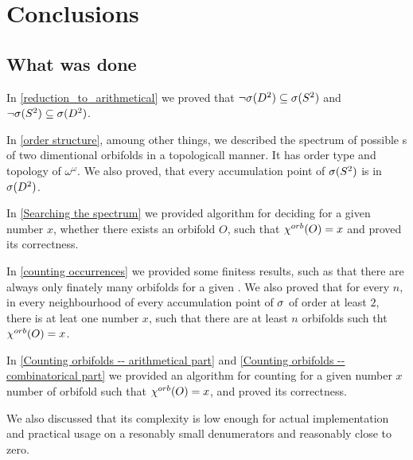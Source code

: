 \chapter{Conclusions}

\section{What was done}
In \ref{reduction_to_arithmetical} we proved that $\neg {{\sigma}(D^2)} \subseteq {{\sigma}(S^2)}$ and 
$\neg {{\sigma}(S^2)} \subseteq {{\sigma}(D^2)}$. 

In \ref{order structure}, amoung other things, we described the spectrum of possible \Eoc s 
of two dimentional orbifolds in a topologicall manner. 
It has order type and topology of $\omega^\omega$. 
We also proved, that every accumulation point of ${{\sigma}(S^2)}$ is in ${{\sigma}(D^2)}$.

In \ref{Searching the spectrum} 
we provided algorithm for deciding for a given number $x$, whether 
there exists an orbifold $O$, such that ${\chi^{orb}(O)} = x$ and proved its correctness.

In \ref{counting occurrences} we provided some finitess results, such as that 
there are always only finately many 
orbifolds for a given \Eoc. 
We also proved that for every $n$, in every neighbourhood of every accumulation point 
of ${\sigma}$ of order at least $2$, there is at leat one number $x$, such that there are at least 
$n$ orbifolds such tht ${\chi^{orb}(O)} = x$.

In \ref{Counting orbifolds -- arithmetical part} 
and \ref{Counting orbifolds -- combinatorical part} 
we provided an algorithm 
 for counting for a given number $x$ number of orbifold such that ${\chi^{orb}(O)} = x$,
and proved its correctness. 
 
We also discussed that its complexity is low enough for actual implementation 
and practical usage on a resonably small denumerators and reasonably close to zero.




